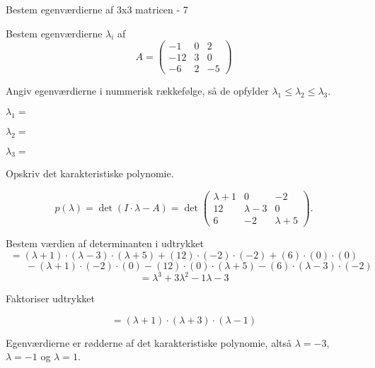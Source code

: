 \documentclass{article}
\begin{document}
\begin{exercise}{Bestem egenværdierne af 3x3 matricen - 7}

Bestem egenværdierne $\lambda_i$ af 
\[
A=\begin{pmatrix}
-1 & 0 & 2 \\
-12 & 3 & 0 \\
-6 & 2 & -5
\end{pmatrix}
\]

Angiv egenværdierne i nummerisk rækkefølge, så de
opfylder $\lambda_1 \le \lambda_2 \le \lambda_3$.

$\lambda_1 = $ 

$\lambda_2 = $ 

$\lambda_3 = $ 

\hint
Opskriv det karakteristiske polynomie.

\hint
\[
p(\lambda)=\det\left(I \cdot \lambda - A \right)=\det\begin{pmatrix}
\lambda + 1 & 0 & -2 \\
12 & \lambda - 3 & 0 \\
6 & -2 & \lambda + 5
\end{pmatrix}.
\]

\hint
Bestem værdien af determinanten i udtrykket
\[
=(\lambda+1) \cdot (\lambda-3) \cdot (\lambda+5)+(12) \cdot (-2) \cdot (-2)+(6) \cdot (0) \cdot (0)
\]
\[
\qquad -(\lambda+1) \cdot (-2) \cdot (0)-(12) \cdot (0) \cdot (\lambda+5)-(6) \cdot (\lambda-3) \cdot (-2) 
\]
\[
=\lambda^3+3\lambda^2-1\lambda-3
\]

\hint
Faktoriser udtrykket

\hint
\[
=(\lambda+1) \cdot (\lambda+3) \cdot (\lambda-1)
\]

\hint
Egenværdierne er rødderne af det karakteristiske polynomie, 
altså
$\lambda=-3$, $\lambda=-1$ og $\lambda=1$.

\end{exercise}
\end{document}
